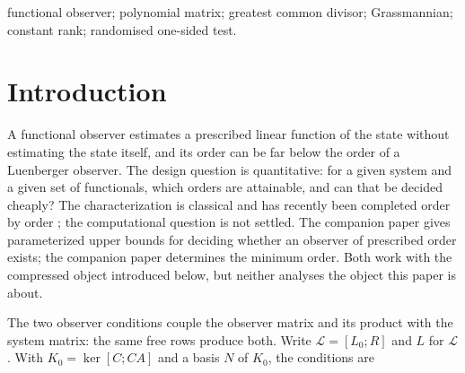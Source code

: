 \documentclass[journal]{IEEEtran}
\theoremstyle{plainn}
\theoremstyle{remark}
\begin{document}
\begin{IEEEkeywords}
functional observer; polynomial matrix; greatest common divisor; Grassmannian; constant rank;
randomised one-sided test.
\end{IEEEkeywords}

\section{Introduction}\label{sec:intro}

A functional observer estimates a prescribed linear function of the state without estimating the
state itself, and its order can be far below the order of a Luenberger observer. The design question
is quantitative: for a given system and a given set of functionals, which orders are attainable, and
can that be decided cheaply? The characterization is classical \cite{fer10,dar25} and has recently
been completed order by order \cite{fer26a,fer26b}; the computational question is not settled. The
companion paper \cite{paperI} gives parameterized upper bounds for deciding whether an observer of
prescribed order exists; the companion paper \cite{paperII} determines the minimum order. Both work
with the compressed object introduced below, but neither analyses the object this paper is about.

The two observer conditions couple the observer matrix and its product with the system matrix: the
same free rows produce both. Write $\mathcal L=[L_0;R]$ and $L$ for $\mathcal L$. With
$K_0=\ker[C;CA]$ and a basis $N$ of $K_0$, the conditions are
\end{document}
